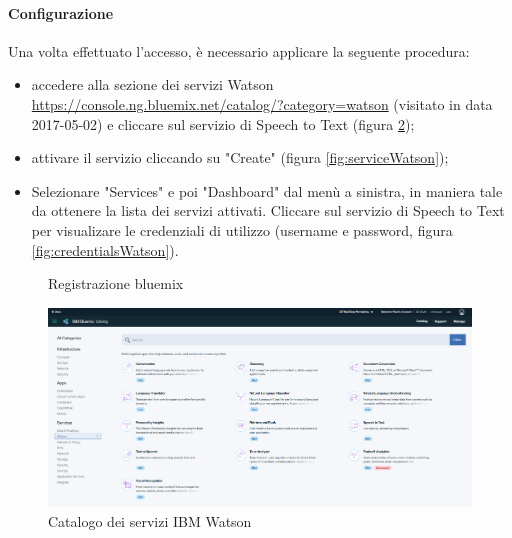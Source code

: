 \paragraph{Configurazione}
Una volta effettuato l'accesso, è necessario applicare la seguente procedura:
\begin{itemize}
	\item accedere alla sezione dei servizi Watson \url{https://console.ng.bluemix.net/catalog/?category=watson} (visitato in data 2017-05-02) e cliccare sul servizio di Speech to Text (figura \ref{fig:consoleWatson});
	\item attivare il servizio cliccando su "Create" (figura \ref{fig:serviceWatson});
	\item Selezionare "Services" e poi "Dashboard" dal menù a sinistra, in maniera tale da ottenere la lista dei servizi attivati. Cliccare sul servizio di Speech to Text per visualizare le credenziali di utilizzo (username e password, figura \ref{fig:credentialsWatson}).
\end{itemize}
\begin{figure}[h]
	\caption{Registrazione bluemix}\label{fig:bluemix}
\end{figure}
\begin{figure}[h]
	\centerline{\includegraphics[width=1\textwidth,height=\textheight,keepaspectratio]{sezioni/images/watson.PNG}}
	\caption{Catalogo dei servizi IBM Watson}\label{fig:consoleWatson}
\end{figure}
